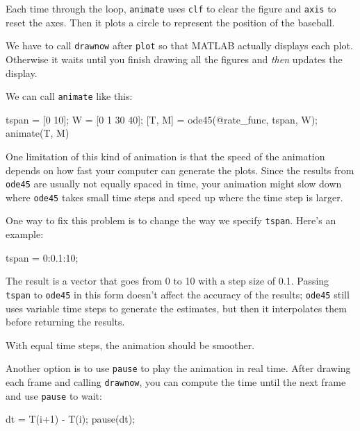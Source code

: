 
Each time through the loop, \lstinline{animate} uses \lstinline{clf}
to clear the figure and \lstinline{axis} to reset the axes.  Then it plots a circle to represent the position of the baseball.


We have to call \lstinline{drawnow} after \lstinline{plot} so
that MATLAB actually displays each plot.  Otherwise it waits
until you finish drawing all the figures and {\em then} updates
the display.

We can call \lstinline{animate} like this:

\begin{code}
    tspan = [0 10];
    W = [0 1 30 40];
    [T, M] = ode45(@rate_func, tspan, W);
    animate(T, M)
\end{code}

One limitation of this kind of animation is that the speed
of the animation depends on how fast your computer can generate
the plots.  Since the results from \lstinline{ode45} are usually not
equally spaced in time, your animation might slow down where
\lstinline{ode45} takes small time steps and speed up where the time
step is larger.


One way to fix this problem is to change the way we specify \lstinline{tspan}.
Here's an example:

\begin{code}
    tspan = 0:0.1:10;
\end{code}

The result is a vector that goes from 0 to 10 with a step size of 0.1.  
Passing \lstinline{tspan} to \lstinline{ode45} in this form doesn't affect the accuracy of the results; 
\lstinline{ode45} still uses variable time steps to generate the estimates, but then it interpolates them before returning the results.


With equal time steps, the animation should be smoother.

Another option is to use \lstinline{pause} to play the animation in
real time.  After drawing each frame and calling
\lstinline{drawnow}, you can compute the time
until the next frame and use \lstinline{pause} to wait:

\begin{code}
    dt = T(i+1) - T(i);
    pause(dt);
\end{code}

